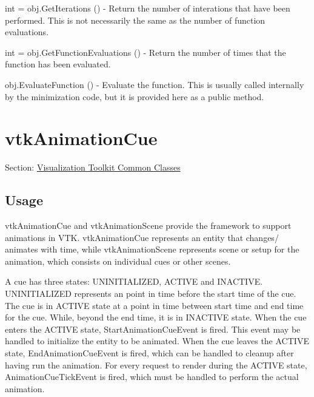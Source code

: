 \begin{DoxyItemize}
\item {\ttfamily int = obj.\-Get\-Iterations ()} -\/ Return the number of interations that have been performed. This is not necessarily the same as the number of function evaluations.  
\item {\ttfamily int = obj.\-Get\-Function\-Evaluations ()} -\/ Return the number of times that the function has been evaluated.  
\item {\ttfamily obj.\-Evaluate\-Function ()} -\/ Evaluate the function. This is usually called internally by the minimization code, but it is provided here as a public method.  
\end{DoxyItemize}\hypertarget{vtkcommon_vtkanimationcue}{}\section{vtk\-Animation\-Cue}\label{vtkcommon_vtkanimationcue}
Section\-: \hyperlink{sec_vtkcommon}{Visualization Toolkit Common Classes} \hypertarget{vtkwidgets_vtkxyplotwidget_Usage}{}\subsection{Usage}\label{vtkwidgets_vtkxyplotwidget_Usage}
vtk\-Animation\-Cue and vtk\-Animation\-Scene provide the framework to support animations in V\-T\-K. vtk\-Animation\-Cue represents an entity that changes/ animates with time, while vtk\-Animation\-Scene represents scene or setup for the animation, which consists on individual cues or other scenes.

A cue has three states\-: U\-N\-I\-N\-I\-T\-I\-A\-L\-I\-Z\-E\-D, A\-C\-T\-I\-V\-E and I\-N\-A\-C\-T\-I\-V\-E. U\-N\-I\-N\-I\-T\-I\-A\-L\-I\-Z\-E\-D represents an point in time before the start time of the cue. The cue is in A\-C\-T\-I\-V\-E state at a point in time between start time and end time for the cue. While, beyond the end time, it is in I\-N\-A\-C\-T\-I\-V\-E state. When the cue enters the A\-C\-T\-I\-V\-E state, Start\-Animation\-Cue\-Event is fired. This event may be handled to initialize the entity to be animated. When the cue leaves the A\-C\-T\-I\-V\-E state, End\-Animation\-Cue\-Event is fired, which can be handled to cleanup after having run the animation. For every request to render during the A\-C\-T\-I\-V\-E state, Animation\-Cue\-Tick\-Event is fired, which must be handled to perform the actual animation.

